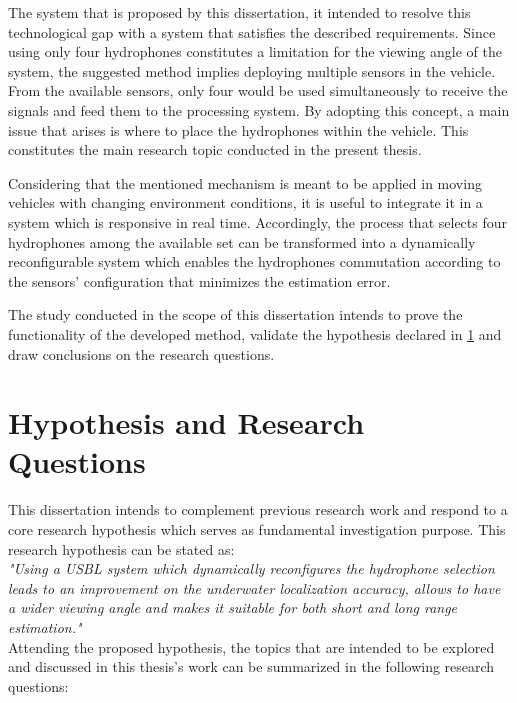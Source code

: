 The system that is proposed by this dissertation, it intended to resolve this technological gap with a system that satisfies the described requirements. Since using only four hydrophones constitutes a limitation for the viewing angle of the system, the suggested method implies deploying multiple sensors in the vehicle. From the available sensors, only four would be used simultaneously to receive the signals and feed them to the processing system. By adopting this concept, a main issue that arises is where to place the hydrophones within the vehicle. This constitutes the main research topic conducted in the present thesis.

Considering that the mentioned mechanism is meant to be applied in moving vehicles with changing environment conditions, it is useful to integrate it in a system which is responsive in real time. Accordingly, the process that selects four hydrophones among the available set can be transformed into a dynamically reconfigurable system which enables the hydrophones commutation according to the sensors' configuration that minimizes the estimation error.

The study conducted in the scope of this dissertation intends to prove the functionality of the developed method, validate the hypothesis declared in \ref{sec:hypoth-rq} and draw conclusions on the research questions.


\section{Hypothesis and Research Questions} \label{sec:hypoth-rq}

This dissertation intends to complement previous research work and respond to a core research hypothesis which serves as fundamental investigation purpose. This research hypothesis can be stated as:
\\

\textit{"Using a USBL system which dynamically reconfigures the hydrophone selection leads to an improvement on the underwater localization accuracy, allows to have a wider viewing angle and makes it suitable for both short and long range estimation."}
\\

Attending the proposed hypothesis, the topics that are intended to be explored and discussed in this thesis's work can be summarized in the following research questions:

